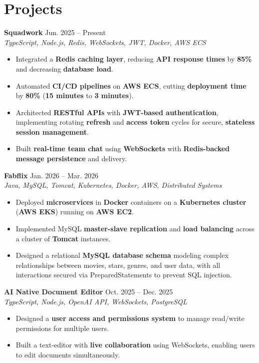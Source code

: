 \documentclass[letterpaper,11pt]{article}
\begin{document}
\section*{Projects}
\textbf{Squadwork} \hfill Jun. 2025 -- Present \\
\textit{TypeScript, Node.js, Redis, WebSockets, JWT, Docker, AWS ECS} \hfill 
\begin{itemize}
  \item Integrated a \textbf{Redis caching layer}, reducing \textbf{API response times} by \textbf{85\%} and decreasing \textbf{database load}.
  \item Automated \textbf{CI/CD pipelines} on \textbf{AWS ECS}, cutting \textbf{deployment time} by \textbf{80\%} (\textbf{15 minutes} to \textbf{3 minutes}).
  \item Architected \textbf{RESTful APIs} with \textbf{JWT-based authentication}, implementing rotating \textbf{refresh} and \textbf{access token} cycles for secure, \textbf{stateless session management}.
  \item Built \textbf{real-time team chat} using \textbf{WebSockets} with \textbf{Redis-backed message persistence} and delivery.
\end{itemize}

\textbf{Fabflix} \hfill Jan. 2026 -- Mar. 2026 \\
\textit{Java, MySQL, Tomcat, Kubernetes, Docker, AWS, Distributed Systems} \hfill 
\begin{itemize}
  \item Deployed \textbf{microservices} in \textbf{Docker} containers on a \textbf{Kubernetes cluster} (\textbf{AWS EKS}) running on \textbf{AWS EC2}.
  \item Implemented MySQL \textbf{master-slave replication} and \textbf{load balancing} across a cluster of \textbf{Tomcat} instances.
  \item Designed a relational \textbf{MySQL database schema} modeling complex relationships between movies, stars, genres, and user data, with all interactions secured via PreparedStatements to prevent SQL injection.
\end{itemize}

\textbf{AI Native Document Editor} \hfill Oct. 2025 -- Dec. 2025 \\
\textit{TypeScript, Node.js, OpenAI API, WebSockets, PostgreSQL} \hfill 
\begin{itemize}
  \item Designed a \textbf{user access and permissions system} to manage read/write permissions for multiple users.
  \item Built a text-editor with \textbf{live collaboration} using WebSockets, enabling users to edit documents simultaneously.
\end{itemize}
\end{document}
